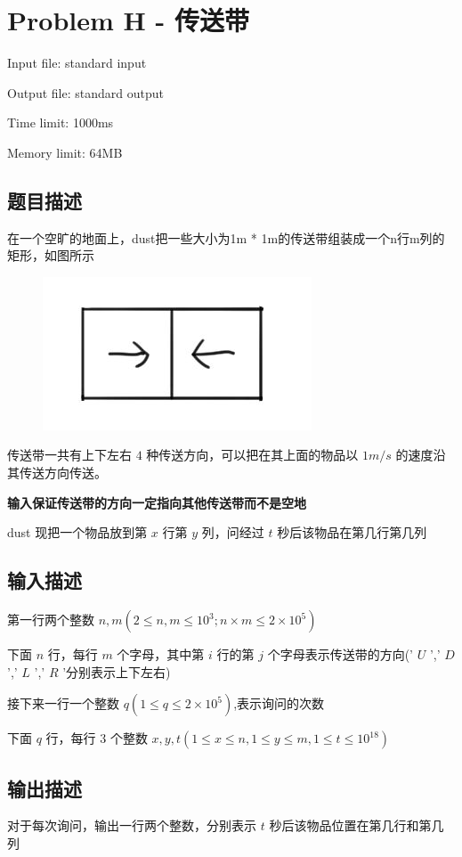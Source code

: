 \newpage
\section{Problem H - 传送带}
{ \limitfont{}
Input file: standard input \par
Output file: standard output \par
Time limit: 1000ms \par
Memory limit: 64MB \par
}
\subsection*{题目描述}
在一个空旷的地面上，dust把一些大小为1m * 1m的传送带组装成一个n行m列的矩形，如图所示
\begin{figure}[H]
    \centering
    \includegraphics[scale=0.5]{./src/h.png}
\end{figure}
传送带一共有上下左右 $4$ 种传送方向，可以把在其上面的物品以 $1m/s$ 的速度沿其传送方向传送。

\textbf{输入保证传送带的方向一定指向其他传送带而不是空地}

dust 现把一个物品放到第 $x$ 行第 $y$ 列，问经过 $t$ 秒后该物品在第几行第几列
\subsection*{输入描述}
第一行两个整数 $n,m(2 \le n,m \le 10^3; n \times m \le 2 \times 10^5)$

下面 $n$ 行，每行 $m$ 个字母，其中第 $i$ 行的第 $j$ 个字母表示传送带的方向(' $U$ ',' $D$ ',' $L$ ',' $R$ '分别表示上下左右)

接下来一行一个整数 $q(1 \le q \le 2 \times 10^5)$,表示询问的次数

下面 $q$ 行，每行 $3$ 个整数 $x,y,t(1 \le x \le n,1 \le y \le m,1 \le t \le 10^{18})$
\subsection*{输出描述}

对于每次询问，输出一行两个整数，分别表示 $t$ 秒后该物品位置在第几行和第几列

